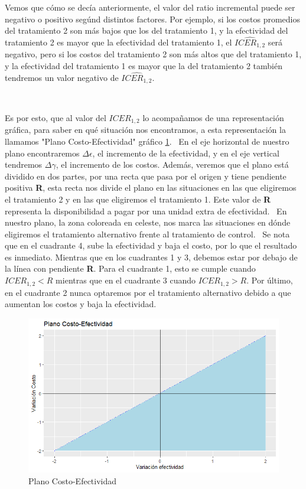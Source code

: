 \documentclass{article}
\begin{document}
Vemos que cómo se decía anteriormente, el valor del ratio incremental puede ser negativo o positivo segúnd distintos factores. Por ejemplo, si los costos promedios del tratamiento 2 son más bajos que los del tratamiento 1, y la efectividad del tratamiento 2 es mayor que la efectividad del tratamiento 1, el $\widehat{ICER_{1,2}}$ será negativo, pero si los costos del tratamiento 2 son más altos que del tratamiento 1, y la efectividad del tratamiento 1 es mayor que la del tratamiento 2 también tendremos un valor negativo de $\widehat{ICER_{1,2}}$.

\

Es por esto, que al valor del $ICER_{1,2}$ lo acompañamos de una representación gráfica, para saber en qué situación nos encontramos, a esta representación la llamamos "Plano Costo-Efectividad" gráfico \ref{fig:1}.
\
En el eje horizontal de nuestro plano encontraremos $\Delta\epsilon$, el incremento de la efectividad, y en el eje vertical tendremos $\Delta\gamma$, el incremento de los costos. Además, veremos que el plano está dividido en dos partes, por una recta que pasa por el origen y tiene pendiente positiva \textbf{R}, esta recta nos divide el plano en las situaciones en las que eligiremos el tratamiento 2 y en las que eligiremos el tratamiento 1. Este valor de \textbf{R} representa la disponibilidad a pagar por una unidad extra de efectividad.
\
En nuestro plano, la zona coloreada en celeste, nos marca las situaciones en dónde eligiremos el tratamiento alternativo frente al tratamiento de control.
\
Se nota que en el cuadrante 4, sube la efectividad y baja el costo, por lo que el resultado es inmediato. Mientras que en los cuadrantes 1 y 3, debemos estar por debajo de la línea con pendiente \textbf{R}. Para el cuadrante 1, esto se cumple cuando $ICER_{1,2}<R$ mientras que en el cuadrante 3 cuando $ICER_{1,2}>R$. Por último, en el cuadrante 2 nunca optaremos por el tratamiento alternativo debido a que aumentan los costos y baja la efectividad.


\begin{figure}[htbp]
    \centering
    \includegraphics[width=1\textwidth]{grafi/Plano_Cost_Efect.jpg}
    \caption{Plano Costo-Efectividad}
    \label{fig:1}
\end{figure}
    
\end{document}
